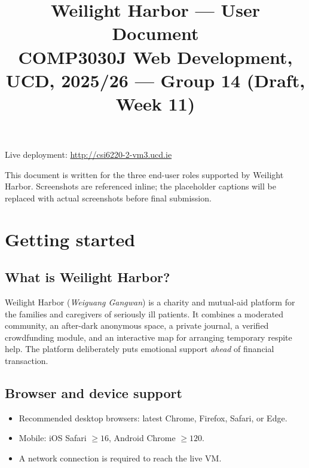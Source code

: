 

\title{\vspace{-1.5cm}\textbf{Weilight Harbor — User Document}\\
       \large COMP3030J Web Development, UCD, 2025/26 — Group 14 (Draft, Week 11)}
\author{}
\date{}


\maketitle
\vspace{-2.0cm}
\begin{center}
  \small
  Live deployment: \url{http://csi6220-2-vm3.ucd.ie}
\end{center}
\vspace{0.4cm}

\noindent
This document is written for the three end-user roles supported by
Weilight Harbor. Screenshots are referenced inline; the placeholder
captions will be replaced with actual screenshots before final
submission.

\section{Getting started}

\subsection{What is Weilight Harbor?}
Weilight Harbor (\textit{Weiguang Gangwan}) is a charity and mutual-aid platform
for the families and caregivers of seriously ill patients. It combines a
moderated community, an after-dark anonymous space, a private journal, a
verified crowdfunding module, and an interactive map for arranging
temporary respite help. The platform deliberately puts emotional
support \emph{ahead} of financial transaction.

\subsection{Browser and device support}
\begin{itemize}
  \item Recommended desktop browsers: latest Chrome, Firefox, Safari, or
        Edge.
  \item Mobile: iOS Safari $\geq 16$, Android Chrome $\geq 120$.
  \item A network connection is required to reach the live VM.
\end{itemize}

